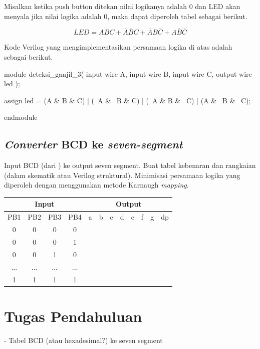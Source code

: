 \documentclass[a4paper,12pt,bahasa]{extarticle}
\begin{document}
Misalkan ketika push button ditekan nilai logikanya adalah 0 dan 
LED akan menyala jika nilai logika adalah 0, maka dapat diperoleh tabel
sebagai berikut.



\begin{equation*}
LED = ABC + \bar{A}\bar{B}C + \bar{A}B\bar{C} + A\bar{B}\bar{C}
\end{equation*}

Kode Verilog yang mengimplementasikan persamaan logika di atas adalah
sebagai berikut.
\begin{verilogcode}
module deteksi_ganjil_3(
  input wire A,
  input wire B,
  input wire C,
  output wire led );

  assign led = (A & B & C) | (~A & ~B & C) | (~A & B & ~C) | (A & ~B & ~C);

endmodule
\end{verilogcode}


\subsection{\textit{Converter} BCD ke \textit{seven-segment}}

Input BCD (dari ) ke output seven segment. Buat tabel kebenaran dan rangkaian (dalam skematik
atau Verilog struktural). Minimisasi persamaan logika yang diperoleh dengan menggunakan
metode Karnaugh \textit{mapping}.

{\centering
\begin{tabular}{|c|c|c|c||c|c|c|c|c|c|c|c|}
\hline
\multicolumn{4}{|c||}{Input} & \multicolumn{8}{|c|}{Output} \\
\hline
PB1 & PB2 & PB3 & PB4 & a & b & c & d & e & f & g & dp \\
\hline
0 & 0 & 0 & 0 &  &  &  &  &  &  &  & \\
0 & 0 & 0 & 1 &  &  &  &  &  &  &  & \\
0 & 0 & 1 & 0 &  &  &  &  &  &  &  & \\
... & ... & ... & ... &  &  &  &  &  &  &  & \\
1 & 1 & 1 & 1 &  &  &  &  &  &  &  & \\
\hline
\end{tabular}
\par}


\section{Tugas Pendahuluan}

- Tabel BCD (atau hexadesimal?) ke seven segment
\end{document}
